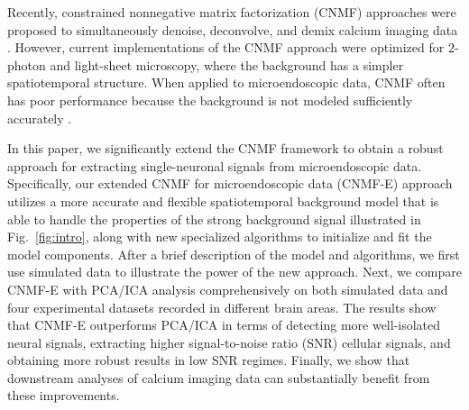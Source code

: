 \documentclass[9pt,lineno]{elife}
\begin{document}
Recently, constrained nonnegative matrix factorization (CNMF) approaches were proposed to simultaneously denoise, deconvolve, and demix calcium imaging data \citep{Pnevmatikakis2016}. However, current implementations of the CNMF approach were optimized for $2$-photon and light-sheet microscopy, where the background has a simpler spatiotemporal structure. When applied to microendoscopic data, CNMF often has poor performance because the background is not modeled sufficiently accurately  \citep{Barbera2016}.  

In this paper, we significantly extend the CNMF framework to obtain a robust approach for extracting single-neuronal signals from microendoscopic data. Specifically, our extended CNMF for microendoscopic data (CNMF-E) approach utilizes a more accurate and flexible spatiotemporal background model that is able to handle the properties of the strong background signal illustrated in Fig.~\ref{fig:intro}, along with new specialized algorithms to initialize and fit the model components. After a brief description of the model and algorithms, we first use simulated data to illustrate the power of the new approach. Next, we compare CNMF-E with PCA/ICA analysis comprehensively on both simulated data and four experimental datasets recorded in different brain areas. The results show that CNMF-E outperforms PCA/ICA in terms of detecting more well-isolated neural signals,  extracting higher signal-to-noise ratio (SNR) cellular signals, and obtaining more robust results in low SNR regimes. Finally, we show that downstream analyses of calcium imaging data can substantially benefit from these improvements.   
\end{document}
